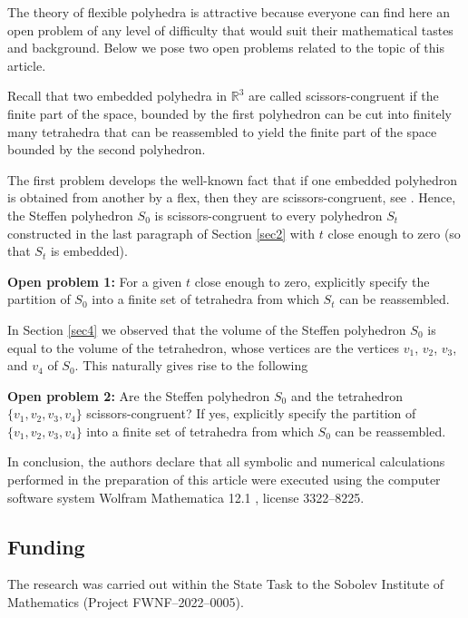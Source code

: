 \documentclass[12pt, reqno]{amsart}
\begin{document}
The theory of flexible polyhedra is attractive because everyone can 
find here an open problem of any level of difficulty that would suit their
mathematical tastes and background.
Below we pose two open problems related to the topic of this article.

Recall that two embedded polyhedra in 
$\mathbb{R}^3$
are called scissors-congruent if the finite part of the space, bounded by the 
first polyhedron can be cut into finitely many tetrahedra that can be reassembled 
to yield the finite part of the space bounded by the second polyhedron.

The first problem develops the well-known fact that if one embedded polyhedron is 
obtained from another by a flex, then they are scissors-congruent, see \cite{GI18}.
Hence, the Steffen polyhedron 
$S_0$
is scissors-congruent to every polyhedron
$S_t$
constructed in the last paragraph of Section \ref{sec2} with 
$t$
close enough to zero (so that 
$S_t$
is embedded).

\textbf{Open problem 1:}
For a given 
$t$
close enough to zero, explicitly specify the partition of 
$S_0$
into a finite set of tetrahedra from which  
$S_t$
can be reassembled.

In Section \ref{sec4} we observed that the volume of the Steffen polyhedron 
$S_0$
is equal to the volume of the tetrahedron, whose vertices are the vertices
$v_1$, $v_2$, $v_3$, 
and
$v_4$  
of 
$S_0$.
This naturally gives rise to the following

\textbf{Open problem 2:}
Are the Steffen polyhedron 
$S_0$
and 
the tetrahedron 
$\{v_1, v_2, v_3, v_4\}$  
scissors-congruent?
If yes, explicitly specify the partition of 
$\{v_1, v_2, v_3, v_4\}$ 
into a finite set of tetrahedra from which  
$S_0$
can be reassembled.

In conclusion, the authors declare that all symbolic and numerical calculations 
performed in the preparation of this article were executed using the computer 
software system Wolfram Mathematica 12.1 \cite{Wo99}, license 3322--8225.

\subsection*{Funding}
The research was carried out within the State Task to the Sobolev Institute of 
Mathematics (Project FWNF--2022--0005).
\end{document}
